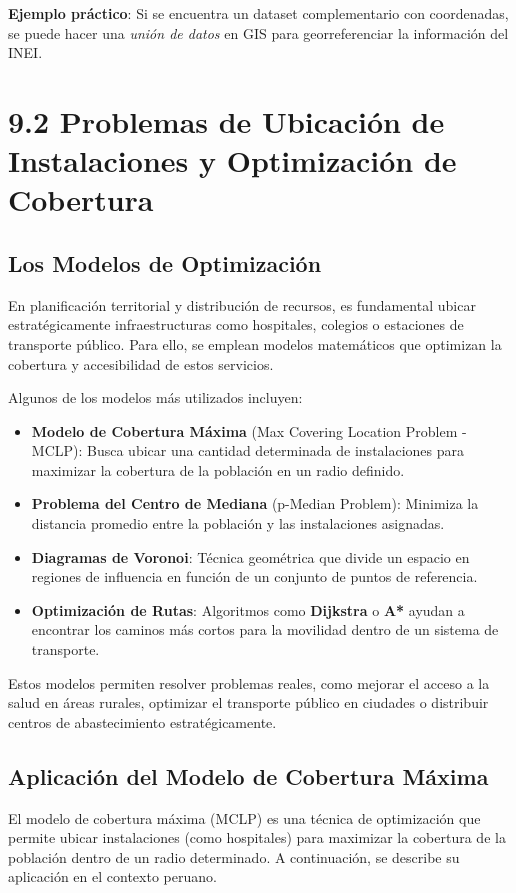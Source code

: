 \documentclass{article}
\begin{document}
\begin{itemize}
	\textbf{Ejemplo práctico}:  
	Si se encuentra un dataset complementario con coordenadas, se puede hacer una \textit{unión de datos} en GIS para georreferenciar la información del INEI.
	
	\section*{9.2 Problemas de Ubicación de Instalaciones y Optimización de Cobertura}
	
	\subsection*{Los Modelos de Optimización}
	En planificación territorial y distribución de recursos, es fundamental ubicar estratégicamente infraestructuras como hospitales, colegios o estaciones de transporte público. Para ello, se emplean modelos matemáticos que optimizan la cobertura y accesibilidad de estos servicios.
	
	Algunos de los modelos más utilizados incluyen:
	
	\begin{itemize}
		\item \textbf{Modelo de Cobertura Máxima} (Max Covering Location Problem - MCLP): Busca ubicar una cantidad determinada de instalaciones para maximizar la cobertura de la población en un radio definido.
		\item \textbf{Problema del Centro de Mediana} (p-Median Problem): Minimiza la distancia promedio entre la población y las instalaciones asignadas.
		\item \textbf{Diagramas de Voronoi}: Técnica geométrica que divide un espacio en regiones de influencia en función de un conjunto de puntos de referencia.
		\item \textbf{Optimización de Rutas}: Algoritmos como \textbf{Dijkstra} o \textbf{A*} ayudan a encontrar los caminos más cortos para la movilidad dentro de un sistema de transporte.
	\end{itemize}
	
	Estos modelos permiten resolver problemas reales, como mejorar el acceso a la salud en áreas rurales, optimizar el transporte público en ciudades o distribuir centros de abastecimiento estratégicamente.
	
	\subsection*{Aplicación del Modelo de Cobertura Máxima}
	El modelo de cobertura máxima (MCLP) es una técnica de optimización que permite ubicar instalaciones (como hospitales) para maximizar la cobertura de la población dentro de un radio determinado. A continuación, se describe su aplicación en el contexto peruano.
	

\end{itemize}
\end{document}
